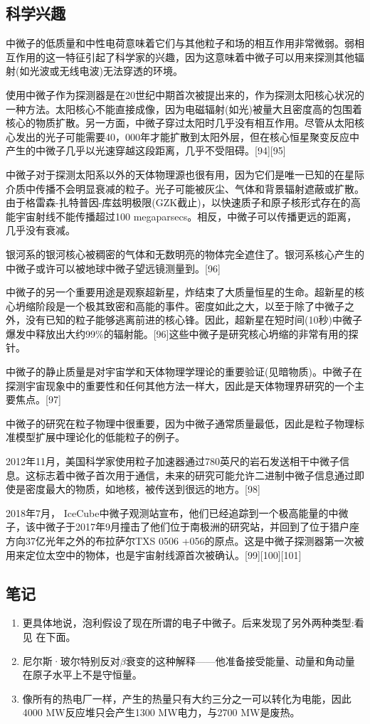 \subsection{科学兴趣}
中微子的低质量和中性电荷意味着它们与其他粒子和场的相互作用非常微弱。弱相互作用的这一特征引起了科学家的兴趣，因为这意味着中微子可以用来探测其他辐射(如光波或无线电波)无法穿透的环境。

使用中微子作为探测器是在20世纪中期首次被提出来的，作为探测太阳核心状况的一种方法。太阳核心不能直接成像，因为电磁辐射(如光)被量大且密度高的包围着核心的物质扩散。另一方面，中微子穿过太阳时几乎没有相互作用。尽管从太阳核心发出的光子可能需要40，000年才能扩散到太阳外层，但在核心恒星聚变反应中产生的中微子几乎以光速穿越这段距离，几乎不受阻碍。[94][95]

中微子对于探测太阳系以外的天体物理源也很有用，因为它们是唯一已知的在星际介质中传播不会明显衰减的粒子。光子可能被灰尘、气体和背景辐射遮蔽或扩散。由于格雷森-扎特普因-库兹明极限(GZK截止)，以快速质子和原子核形式存在的高能宇宙射线不能传播超过100 megaparsecs。相反，中微子可以传播更远的距离，几乎没有衰减。

银河系的银河核心被稠密的气体和无数明亮的物体完全遮住了。银河系核心产生的中微子或许可以被地球中微子望远镜测量到。[96]

中微子的另一个重要用途是观察超新星，炸结束了大质量恒星的生命。超新星的核心坍缩阶段是一个极其致密和高能的事件。密度如此之大，以至于除了中微子之外，没有已知的粒子能够逃离前进的核心锋。因此，超新星在短时间(10秒)中微子爆发中释放出大约99\%的辐射能。[96]这些中微子是研究核心坍缩的非常有用的探针。

中微子的静止质量是对宇宙学和天体物理学理论的重要验证(见暗物质)。中微子在探测宇宙现象中的重要性和任何其他方法一样大，因此是天体物理界研究的一个主要焦点。[97]

中微子的研究在粒子物理中很重要，因为中微子通常质量最低，因此是粒子物理标准模型扩展中理论化的低能粒子的例子。

2012年11月，美国科学家使用粒子加速器通过780英尺的岩石发送相干中微子信息。这标志着中微子首次用于通信，未来的研究可能允许二进制中微子信息通过即使是密度最大的物质，如地核，被传送到很远的地方。[98]

2018年7月， IceCube中微子观测站宣布，他们已经追踪到一个极高能量的中微子，该中微子于2017年9月撞击了他们位于南极洲的研究站，并回到了位于猎户座方向37亿光年之外的布拉萨尔TXS 0506 +056的原点。这是中微子探测器第一次被用来定位太空中的物体，也是宇宙射线源首次被确认。[99][100][101]

\subsection{笔记}
\begin{enumerate}
\item 更具体地说，泡利假设了现在所谓的电子中微子。后来发现了另外两种类型:看见 在下面。
\item 尼尔斯·玻尔特别反对$\beta$衰变的这种解释——他准备接受能量、动量和角动量在原子水平上不是守恒量。
\item 像所有的热电厂一样，产生的热量只有大约三分之一可以转化为电能，因此4000 MW反应堆只会产生1300 MW电力，与2700 MW是废热。
\end{enumerate}

